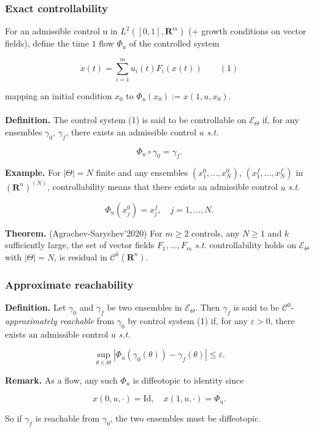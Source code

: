 \documentclass[9pt]{beamer}
\def\R{\mathbf{R}}
\begin{document}
\begin{frame}
\frametitle{\bf Exact controllability}

For an admissible control u in
$L^2([0,1],\R^m)$ (+ growth conditions on vector fields), define the time $1$ flow $\Phi_u$
of the controlled system

\[ \dot{x}(t) = \sum_{i=1}^m u_i(t)F_i(x(t)) \qquad (1) \]

mapping an initial condition $x_0$ to $\Phi_u(x_0) := x(1,u,x_0)$.\\
\ \\
\textbf{Definition.} The control system (1) is said to be controllable
on $\mathscr{E}_\Theta$ if, for any ensembles $\gamma_0$, $\gamma_f$, there exists an admissible
control $u$ \emph{s.t.}

\[ \Phi_u \circ \gamma_0 = \gamma_f. \]

\textbf{Example.} For $|\Theta| = N$ finite and any ensembles 
$(x^0_1,\ldots,x^0_N)$, $(x^f_1,\ldots,x^f_N)$ in
$(\R^n)^{(N)}$, controllability means that there exists an admissible control
$u$ \emph{s.t.}

\[ \Phi_u(x^0_j) = x^f_j,\quad j=1,\ldots,N. \]

\textbf{Theorem.} (Agrachev-Sarychev'2020) For $m \geq 2$ controls, any $N \geq 1$ and $k$ sufficiently
large, the set of vector fields $F_1,\ldots,F_m$
\emph{s.t.} controllability holds on $\mathscr{E}_\Theta$ with $|\Theta| = N$, is residual in
$\mathscr{C}^k(\R^n)$.
  
\end{frame}

\begin{frame}
\frametitle{\bf Approximate reachability}

\textbf{Definition.} Let $\gamma_0$ and $\gamma_f$ be two ensembles in
$\mathscr{E}_\Theta$. Then $\gamma_f$ is said to be $\mathscr{C}^0$-\emph{approximately
reachable} from $\gamma_0$ by control system (1) if, for any $\varepsilon > 0$, there exists an admissible control
$u$ \emph{s.t.}

\[ \sup_{\theta \in \Theta} |\Phi_u(\gamma_0(\theta))-\gamma_f(\theta)| \leq \varepsilon. \]

\textbf{Remark.} As a flow, any such $\Phi_u$ is diffeotopic to identity since

\[ x(0,u,\cdot) = \text{Id},\quad x(1,u,\cdot) = \Phi_u. \]

So if $\gamma_f$ is reachable from $\gamma_0$, the two ensembles must be diffeotopic.

\end{frame}
\end{document}
